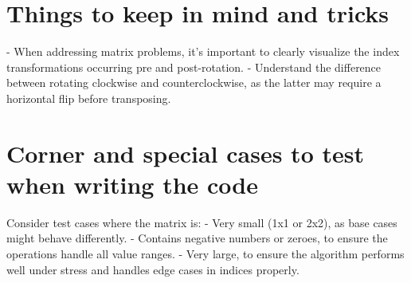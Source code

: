 \section*{Things to keep in mind and tricks}
- When addressing matrix problems, it's important to clearly visualize the index transformations occurring pre and post-rotation.
- Understand the difference between rotating clockwise and counterclockwise, as the latter may require a horizontal flip before transposing.

\section*{Corner and special cases to test when writing the code}
Consider test cases where the matrix is:
- Very small (1x1 or 2x2), as base cases might behave differently.
- Contains negative numbers or zeroes, to ensure the operations handle all value ranges.
- Very large, to ensure the algorithm performs well under stress and handles edge cases in indices properly.